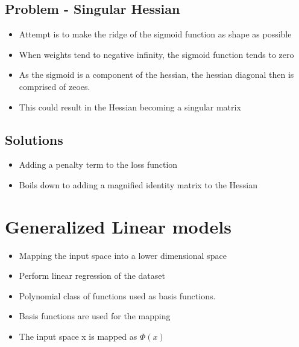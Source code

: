\documentclass[parskip=half]{scrartcl}
\begin{document}

    \subsection{Problem - Singular Hessian}\label{problem---singular-hessian}

    \begin{itemize}
        \item
        Attempt is to make the ridge of the sigmoid function as shape as
        possible
        \item
        When weights tend to negative infinity, the sigmoid function tends to
        zero
        \item
        As the sigmoid is a component of the hessian, the hessian diagonal
        then is comprised of zeoes.
        \item
        This could result in the Hessian becoming a singular matrix
    \end{itemize}

    \subsection{Solutions}\label{solutions}

    \begin{itemize}
        \item
        Adding a penalty term to the loss function
        \item
        Boils down to adding a magnified identity matrix to the Hessian
    \end{itemize}

\section{Generalized Linear models}\label{generalized-linear-models}

    \begin{itemize}
        \item
        Mapping the input space into a lower dimensional space
        \item
        Perform linear regression of the dataset
        \item
        Polynomial class of functions used as basis functions.
        \item
        Basis functions are used for the mapping
        \item
        The input space x is mapped as $\Phi(x)$
    \end{itemize}
\end{document}
